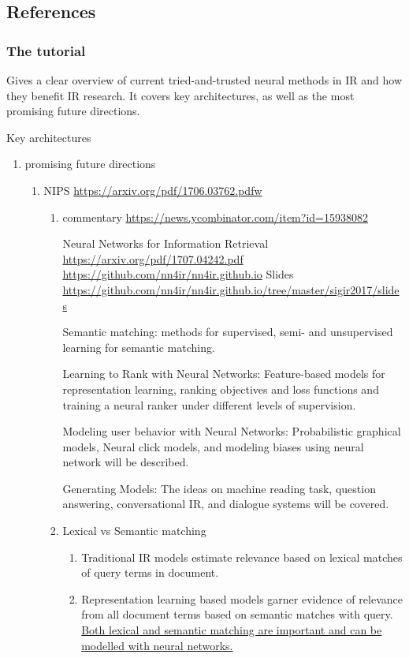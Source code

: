 \documentclass[11pt]{article}
\begin{document}
\subsection{References}
\label{sec:org8c5a4fb}
\subsubsection{The tutorial}
\label{sec:org597e716}
Gives a clear overview of current tried-and-trusted neural methods in IR and how they benefit IR research. It covers key architectures, as well as the most promising future directions.

Key architectures
\begin{enumerate}
\item promising future directions
\label{sec:org8482736}
\begin{enumerate}
\item 
\label{sec:org282a65b}
\cite{Memaccess}
NIPS
\url{https://arxiv.org/pdf/1706.03762.pdfw}
\begin{enumerate}
\item commentary
\label{sec:org7c861c8}
\url{https://news.ycombinator.com/item?id=15938082}


Neural Networks for Information Retrieval
\url{https://arxiv.org/pdf/1707.04242.pdf}
\url{https://github.com/nn4ir/nn4ir.github.io}
Slides
\url{https://github.com/nn4ir/nn4ir.github.io/tree/master/sigir2017/slides}

Semantic matching:
methods for supervised, semi- and unsupervised learning for semantic matching.

Learning to Rank with Neural Networks:
Feature-based models for representation learning, ranking objectives and loss functions
and training a neural ranker under different levels of supervision.

Modeling user behavior with Neural Networks:
Probabilistic graphical models, Neural click models, and modeling biases using neural network will be described.

Generating Models:
The ideas on machine reading task, question answering, conversational IR, and dialogue systems will be covered.


\item Lexical vs Semantic matching
\label{sec:orga27b8fb}
\begin{enumerate}
\item Traditional IR models
\label{sec:org122066d}
estimate relevance based on lexical matches of query terms in document.
\item Representation learning based models garner evidence of relevance from all document terms based on semantic matches with query.
\label{sec:orgfb5f6fb}
\uline{Both lexical and semantic matching are important and can be modelled with neural networks.}
\end{enumerate}
\end{enumerate}
\end{enumerate}



\end{enumerate}
\end{document}
